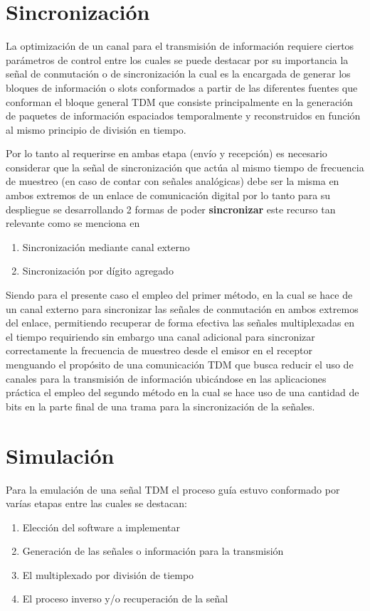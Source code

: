 \documentclass[conference]{IEEEtran}
\begin{document}
	\section{Sincronización}
	
	La optimización de un canal para el transmisión de información requiere ciertos parámetros de control entre los cuales se puede destacar por su importancia la señal de conmutación o de sincronización la cual es la encargada de generar los bloques de información o slots conformados a partir de las diferentes fuentes que conforman el bloque general TDM que consiste principalmente en la generación de paquetes de información espaciados temporalmente y reconstruidos en función al mismo principio de división en tiempo.
	
	Por lo tanto al requerirse en ambas etapa (envío y recepción) es necesario considerar que la señal de sincronización que actúa al mismo tiempo de frecuencia de muestreo (en caso de contar con señales analógicas) debe ser la misma en ambos extremos de un enlace de comunicación digital por lo tanto para su despliegue se desarrollando 2 formas de poder \textbf{sincronizar} este recurso tan relevante como se menciona en \cite{couch2012sistemas}
	
	\begin{enumerate}
		\item Sincronización mediante canal externo
		\item Sincronización por dígito agregado
	\end{enumerate}
	
	Siendo para el presente caso el empleo del primer método, en la cual se hace de un canal externo para sincronizar las señales de conmutación en ambos extremos del enlace, permitiendo recuperar de forma efectiva las señales multiplexadas en el tiempo requiriendo sin embargo una canal adicional para sincronizar correctamente la frecuencia de muestreo desde el emisor en el receptor menguando el propósito de una comunicación TDM que busca reducir el uso de canales para la transmisión de información ubicándose en las aplicaciones práctica el empleo del segundo método en la cual se hace uso de una cantidad de bits en la parte final de una trama para la sincronización de la señales.
	
	\section{Simulación}
	
	Para la emulación de una señal TDM el proceso guía estuvo conformado por varías etapas entre las cuales se destacan:
	\begin{enumerate}
		\item Elección del software a implementar
		\item Generación de las señales o información para la transmisión
		\item El multiplexado por división de tiempo
		\item El proceso inverso y/o recuperación de la señal
	\end{enumerate}
		
\end{document}
